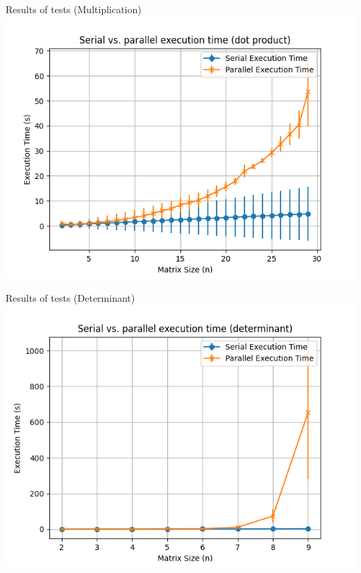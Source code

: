 \documentclass{beamer}
\begin{document}
\begin{frame}[fragile]{Results of tests (Multiplication)}
    \centering
    \includegraphics[width=\textwidth]{../img/dot_2_30_5.png}
\end{frame}

\begin{frame}[fragile]{Results of tests (Determinant)}
    \centering
    \includegraphics[width=\textwidth]{../img/det_2_10_3.png}
\end{frame}
\end{document}
